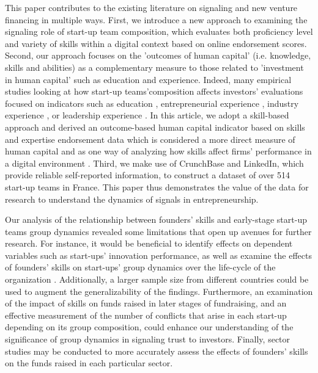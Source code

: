 \documentclass[12pt]{article}
\begin{document}
This paper contributes to the existing literature on signaling and new venture financing in multiple ways. First, we introduce a new approach to examining the signaling role of start-up team composition, which evaluates both proficiency level and variety of skills within a digital context based on online endorsement scores. Second, our approach focuses on the 'outcomes of human capital' (i.e. knowledge, skills and abilities) as a complementary measure to those related to 'investment in human capital' such as education and experience. Indeed, many empirical studies looking at how start-up teams'composition affects investors' evaluations focused on indicators such as education \citep{franke2008venture}, entrepreneurial experience \citep{beckman2007early}, industry experience \citep{becker2015new}, or leadership experience \citep{hoenig2015quality}. In this article, we adopt a skill-based approach and derived an outcome-based human capital indicator based on skills and expertise endorsement data which is considered a more direct measure of human capital and as one way of analyzing how skills affect firms' performance in a digital environment \citep{marvel2016human}. Third, we make use of CrunchBase and LinkedIn, which provide reliable self-reported information, to construct a dataset of over 514 start-up teams in France. This paper thus demonstrates the value of the data for research to understand the dynamics of signals in entrepreneurship.

Our analysis of the relationship between founders' skills and early-stage start-up teams group dynamics revealed some limitations that open up avenues for further research. For instance, it would be beneficial to identify effects on dependent variables such as start-ups' innovation performance, as well as examine the effects of founders' skills on start-ups' group dynamics over the life-cycle of the organization \citep{knight2020start}. Additionally, a larger sample size from different countries could be used to augment the generalizability of the findings. Furthermore, an examination of the impact of skills on funds raised in later stages of fundraising, and an effective measurement of the number of conflicts that arise in each start-up depending on its group composition, could enhance our understanding of the significance of group dynamics in signaling trust to investors. Finally, sector studies may be conducted to more accurately assess the effects of founders' skills on the funds raised in each particular sector.
\end{document}
